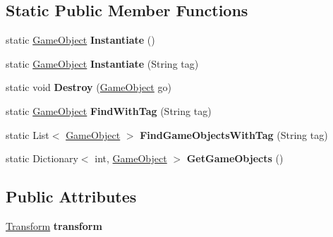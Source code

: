 \subsection*{Static Public Member Functions}
\begin{DoxyCompactItemize}
\item 
\mbox{\label{class_ecs_1_1_game_object_ae4dc7a9531fd8fa3d087b26042866fa5}} 
static \mbox{\hyperlink{class_ecs_1_1_game_object}{Game\+Object}} {\bfseries Instantiate} ()
\item 
\mbox{\label{class_ecs_1_1_game_object_a88f74329a483cac3ed276a3d6f896256}} 
static \mbox{\hyperlink{class_ecs_1_1_game_object}{Game\+Object}} {\bfseries Instantiate} (String tag)
\item 
\mbox{\label{class_ecs_1_1_game_object_a81390ec2e672a710e43116eb3d41df7b}} 
static void {\bfseries Destroy} (\mbox{\hyperlink{class_ecs_1_1_game_object}{Game\+Object}} go)
\item 
\mbox{\label{class_ecs_1_1_game_object_afdc4e1a061dc8dfbaa7399a86532a0da}} 
static \mbox{\hyperlink{class_ecs_1_1_game_object}{Game\+Object}} {\bfseries Find\+With\+Tag} (String tag)
\item 
\mbox{\label{class_ecs_1_1_game_object_a1eb8dc519b642587b6517cb4ad569fc1}} 
static List$<$ \mbox{\hyperlink{class_ecs_1_1_game_object}{Game\+Object}} $>$ {\bfseries Find\+Game\+Objects\+With\+Tag} (String tag)
\item 
\mbox{\label{class_ecs_1_1_game_object_a2f4b7b28652651d02135919e75c5ad0d}} 
static Dictionary$<$ int, \mbox{\hyperlink{class_ecs_1_1_game_object}{Game\+Object}} $>$ {\bfseries Get\+Game\+Objects} ()
\end{DoxyCompactItemize}
\subsection*{Public Attributes}
\begin{DoxyCompactItemize}
\item 
\mbox{\label{class_ecs_1_1_game_object_a0e1caafb0f43cf8d35d10e7e3b82cbb7}} 
\mbox{\hyperlink{class_ecs_1_1_transform}{Transform}} {\bfseries transform}
\end{DoxyCompactItemize}


